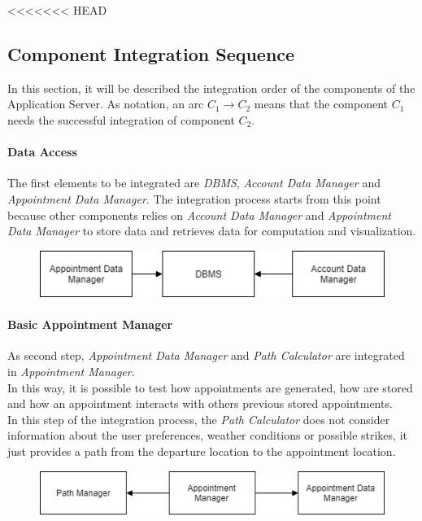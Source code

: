 <<<<<<< HEAD

\subsection{Component Integration Sequence}

In this section, it will be described the integration order of the components of the Application Server.
As notation, an arc $C_1 \rightarrow C_2$ means that the component $C_1$ needs the successful integration of component $C_2$.


\paragraph*{Data Access\\}
The first elements to be integrated are \emph{DBMS}, \emph{Account Data Manager} and \emph{Appointment Data Manager}. 
The integration process starts from this point because other components relies on \emph{Account Data Manager} and \emph{Appointment Data Manager} to store data and retrieves data for computation and visualization.
\begin{figure}[H]
	\includegraphics[width=\textwidth, keepaspectratio=true]{Img/FirstStep}
\end{figure}

\paragraph*{Basic Appointment Manager\\}
As second step, \emph{Appointment Data Manager} and \emph{Path Calculator} are integrated in \emph{Appointment Manager}.\\
In this way, it is possible to test how appointments are generated, how are stored and how an appointment interacts with others previous stored appointments.\\
In this step of the integration process, the \emph{Path Calculator} does not consider information about the user preferences, weather conditions or possible strikes, it just provides a path from the departure location to the appointment location.

\begin{figure}[H]
	\includegraphics[width=\textwidth, keepaspectratio=true]{Img/SecondStep}
\end{figure}


